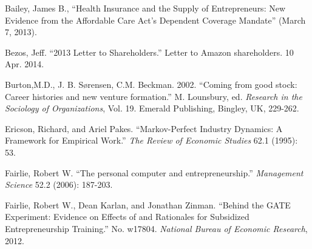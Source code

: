 \documentclass[12pt]{article}
\begin{document}
\newpage

\begin{thebibliography}{99}

\begin{comment}

\bibitem{abadie}
Abadie, Alberto. ``Synthetic Control Methods for Comparative Case Studies: Estimating the Effect of California’s Tobacco Control Program.'' Journal of the American Statistical Association 105 (2010): 493-505

\bibitem{acharya}
Acharya, Viral, and Krishnamurthy Subramanian, 2009, Bankruptcy codes and innovation, \emph{Review of Financial Studies} 22, 4949-4988.

\bibitem{kaufman}
Atkinson, Robert D., Scott Andes. 2010 ``The 2010 State New Economy Index: Benchmarking Economic Transformation in the States'' The Information Technology and Innovation Foundation, Kauffman Foundation


\bibitem{bhide}
Bhide, Amar. \emph{The origin and evolution of new businesses}. New York: Oxford UP, 2000.




\end{comment}

Bailey, James B., ``Health Insurance and the Supply of Entrepreneurs: New Evidence from the Affordable Care Act's Dependent Coverage Mandate'' (March 7, 2013). 

Bezos, Jeff. ``2013 Letter to Shareholders.'' Letter to Amazon shareholders. 10 Apr. 2014.

Burton,M.D., J. B. S{\o}rensen, C.M. Beckman. 2002. ``Coming from good stock: Career histories and new venture formation.'' M. Lounsbury, ed. \emph{Research in the Sociology of Organizations}, Vol. 19. Emerald Publishing, Bingley, UK, 229-262.

Ericson, Richard, and Ariel Pakes. ``Markov-Perfect Industry Dynamics: A Framework for Empirical Work.'' \emph{The Review of Economic Studies} 62.1 (1995): 53.

Fairlie, Robert W. ``The personal computer and entrepreneurship.'' \emph{Management Science} 52.2 (2006): 187-203.

Fairlie, Robert W., Dean Karlan, and Jonathan Zinman. ``Behind the GATE Experiment: Evidence on Effects of and Rationales for Subsidized Entrepreneurship Training.'' No. w17804. \emph{National Bureau of Economic Research}, 2012.


\end{thebibliography}
\end{document}
